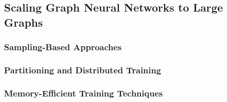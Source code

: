 \subsection{Scaling Graph Neural Networks to Large Graphs}
\label{sec:relwork:scaling}

\subsubsection{Sampling-Based Approaches}
\label{sec:relwork:scaling:sampling}

\subsubsection{Partitioning and Distributed Training}
\label{sec:relwork:scaling:distributed}

\subsubsection{Memory-Efficient Training Techniques}
\label{sec:relwork:scaling:memory}
